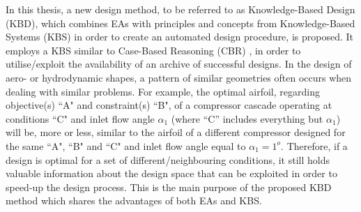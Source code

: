 In this thesis, a new design method, to be referred to as  Knowledge-Based Design (KBD), which combines EAs with principles and concepts from Knowledge-Based Systems (KBS) in order to create an automated design procedure, is proposed. It employs a KBS similar to Case-Based Reasoning (CBR) \cite{kolodner_1991,kolodner_1993,slade_1991,riesbeck_1989}, in order to utilise/exploit the availability of an archive of successful designs. In the design of aero- or hydrodynamic shapes, a pattern of similar geometries often occurs when dealing with similar problems. For example, the optimal airfoil, regarding objective(s) ``A" and constraint(s) ``B", of a compressor cascade operating at conditions ``C" and inlet flow angle $\alpha_1$ (where ``C'' includes everything but $\alpha_1$) will be, more or less, similar to the airfoil of a different compressor designed for the same ``A", ``B" and ``C" and inlet flow angle equal to $\alpha_1\!=\!1^o$.  Therefore, if a design is optimal for a set of different/neighbouring conditions, it still holds valuable information about the design space that can be exploited in order to speed-up the design process. This is the main purpose of the proposed KBD method which shares the advantages of both EAs and KBS.    

